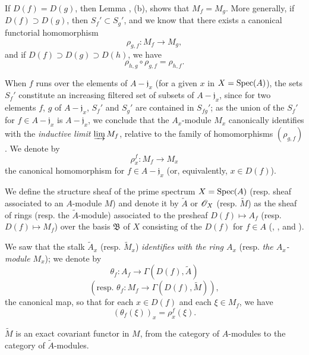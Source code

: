 \begin{env}[1.3.3]
\label{1.1.3.3}
If $D(f)=D(g)$, then Lemma , (b), shows that $M_f=M_g$. More generally, if
$D(f)\supset D(g)$, then $S_f'\subset S_g'$, and we know  that there exists
a canonical functorial homomorphism
\[
  \rho_{g,f}:M_f\longrightarrow M_g,
\]
and if $D(f)\supset D(g)\supset D(h)$, we have 
\[
  \rho_{h,g}\circ\rho_{g,f}=\rho_{h,f}.
  \tag{1.3.3.1}
\]
\end{env}

When $f$ runs over the elements of $A-\mathfrak{j}_x$ (for a given $x$ in $X={\mathop{\mathrm{Spec}}\nolimits}(A)$), the
sets $S_f'$ constitute an increasing filtered set of subsets of $A-\mathfrak{j}_x$, since for
two elements $f$, $g$ of $A-\mathfrak{j}_x$, $S_f'$ and $S_g'$ are contained in $S_{fg}'$; as
the union of the $S_f'$ for $f\in A-\mathfrak{j}_x$ is $A-\mathfrak{j}_x$, we conclude
 that the $A_x$-module $M_x$ canonically identifies with the {\em inductive
limit} $\varinjlim M_f$, relative to the family of homomorphisms $(\rho_{g,f})$. We denote by
\[
  \rho_x^f:M_f\longrightarrow M_x
\]
the canonical homomorphism for $f\in A-\mathfrak{j}_x$ (or, equivalently, $x\in D(f)$).

\begin{defn}[1.3.4]
\label{1.1.3.4}
We define the structure sheaf of the prime spectrum $X={\mathop{\mathrm{Spec}}\nolimits}(A)$ (resp. sheaf associated to
an $A$-module $M$) and denote it by $\widetilde{A}$ or $\mathscr{O}_X$ (resp. $\widetilde{M}$) as the
sheaf of rings (resp. the $\widetilde{A}$-module) associated to the presheaf
$D(f)\mapsto A_f$ (resp. $D(f)\mapsto M_f$) over the basis $\mathfrak{B}$ of $X$ consisting
of the $D(f)$ for $f\in A$ (, , and
).
\end{defn}

We saw  that the stalk $\widetilde{A}_x$ (resp. $\widetilde{M}_x$)
{\em identifies with the ring $A_x$} (resp. {\em the $A_x$-module $M_x$}); we denote by
\[
  \theta_f:A_f\longrightarrow\Gamma(D(f),\widetilde{A})
\]
\[
  (\text{resp. }\theta_f:M_f\longrightarrow\Gamma(D(f),\widetilde{M})),
\]
the canonical map, so that for each $x\in D(f)$ and each $\xi\in M_f$, we have
\[
  (\theta_f(\xi))_x=\rho_x^f(\xi).
  \tag{1.3.4.1}
\]

\begin{prop}[1.3.5]
\label{1.1.3.5}
$\widetilde{M}$ is an exact covariant functor in $M$, from the category of $A$-modules to the
category of $\widetilde{A}$-modules.
\end{prop}

